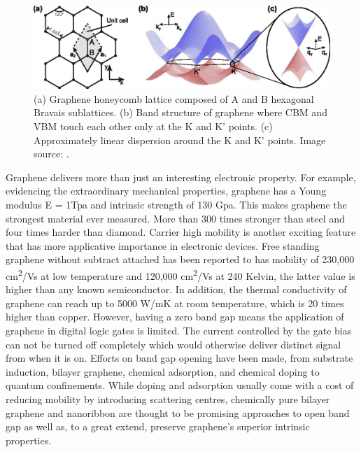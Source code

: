 \begin{figure}[htbp!] 
\centering  
\includegraphics[width=\textwidth]{gra_lat_band.eps}
\caption[Graphene lattice and band structure.]{(a) Graphene honeycomb lattice composed of A and B hexagonal Bravais sublattices. (b) Band structure of graphene where CBM and VBM touch each other only at the K and K' points. (c) Approximately linear dispersion around the K and K' points. Image source: \cite{Guttinger2012}. }  
\label{fig:gra_band}
\end{figure} 

Graphene delivers more than just an interesting electronic property. For example, evidencing the extraordinary mechanical properties, graphene has a Young modulus E = 1Tpa and intrinsic strength of 130 Gpa\cite{Lee385}. This makes graphene the strongest material ever measured. More than 300 times stronger than steel and four times harder than diamond. Carrier high mobility is another exciting feature that has more applicative importance in electronic devices. Free standing graphene without subtract attached has been reported to has mobility of 230,000 \si{cm^2/Vs} at low temperature\cite{Bolotin2008a} and 120,000 \si{cm^2/Vs} at 240 Kelvin, the latter value is higher than any known semiconductor\cite{Bolotin2008b}. In addition, the thermal conductivity of graphene can reach up to 5000 \si{W/mK} at room temperature, which is 20 times higher than copper\cite{balandin2008}. However, having a zero band gap means the application of graphene in digital logic gates is limited. The current controlled by the gate bias can not be turned off completely which would otherwise deliver distinct signal from when it is on. Efforts on band gap opening have been made, from substrate induction\cite{Ci2010,zhou2007}, bilayer graphene\cite{mccann2006,castro2007}, chemical adsorption\cite{Elias2009,Jeon2011}, and chemical doping\cite{zhou2008} to quantum confinements\cite{Nakada1996,Barone2006}.  While doping and adsorption usually come with a cost of reducing mobility by introducing scattering centres, chemically pure bilayer graphene and nanoribbon are thought to be promising approaches to open band gap as well as, to a great extend, preserve graphene's superior intrinsic properties.

